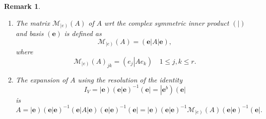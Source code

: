 \documentclass[aps,preprint]{revtex4}%
\newtheorem{remark}[theorem]{Remark}
\begin{document}
\begin{remark}
\begin{enumerate}
\begin{enumerate}
\item In terms of the tensor product and the map $\Xi_{VV^{d}}$
\begin{align}
A  &  =\Xi_{VV^{d}}\left(  A\left(  \mathbf{e}\right)  \mathbf{\otimes}\left(
\mathbf{e}^{d}\right)  \right)  =\Xi_{VV^{d}}\left(  \left(  \mathbf{a}%
\right)  \mathbf{\otimes}\left(  \mathbf{e}^{d}\right)  \right)  =\Xi_{VV^{d}%
}\left(  \left(  \left(  \mathbf{e}\right)  \mathcal{R}_{e}\left(  A\right)
\right)  \mathbf{\otimes}\left(  \mathbf{e}^{d}\right)  \right) \\
&  =\Xi_{VV^{d}}\left(  \sum_{1\leq j,k\leq r}\left(  e_{j}\otimes e_{k}%
^{d}\right)  \mathcal{R}_{e}\left(  A\right)  _{jk}\right)  =\sum_{1\leq
j,k\leq r}\Xi_{VV^{d}}\left(  e_{j}\otimes e_{k}^{d}\right)  \mathcal{R}%
_{e}\left(  A\right)  _{jk}.
\end{align}

\end{enumerate}

\item The matrix $\mathcal{M}_{\left\vert e\right)  }\left(  A\right)  $ of
$A$ wrt the complex symmetric inner product $\left(  \left.  {}\right\vert
\right)  $ and basis $\left(  \mathbf{e}\right)  $ is defined as
\begin{equation}
\mathcal{M}_{\left\vert e\right)  }\left(  A\right)  =\left(  \mathbf{e}%
\right\vert A\left\vert \mathbf{e}\right)  ,
\end{equation}
where
\begin{equation}
\mathcal{M}_{\left\vert e\right)  }\left(  A\right)  _{jk}=\left(  \left.
e_{j}\right\vert Ae_{k}\right)  \quad1\leq j,k\leq r.
\end{equation}


\item The expansion of $A$ using the resolution of the identity
\begin{equation}
I_{V}=\left\vert \mathbf{e}\right)  \left(  \left.  \mathbf{e}\right\vert
\mathbf{e}\right)  ^{-1}\left(  \mathbf{e}\right\vert =\left\vert
\mathbf{e}^{b}\right)  \left(  \mathbf{e}\right\vert
\end{equation}
is%
\begin{equation}
A=\left\vert \mathbf{e}\right)  \left(  \left.  \mathbf{e}\right\vert
\mathbf{e}\right)  ^{-1}\left(  \mathbf{e}\right\vert A\left\vert
\mathbf{e}\right)  \left(  \left.  \mathbf{e}\right\vert \mathbf{e}\right)
^{-1}\left(  \mathbf{e}\right\vert =\left\vert \mathbf{e}\right)  \left(
\left.  \mathbf{e}\right\vert \mathbf{e}\right)  ^{-1}\mathcal{M}_{\left\vert
e\right)  }\left(  A\right)  \left(  \left.  \mathbf{e}\right\vert
\mathbf{e}\right)  ^{-1}\left(  \mathbf{e}\right\vert .
\end{equation}



\end{enumerate}
\end{remark}
\end{document}
